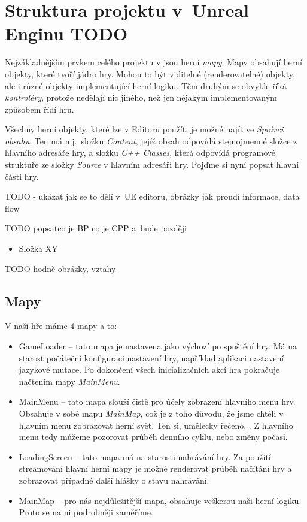 
\section{Struktura projektu v~Unreal Enginu TODO}
\label{sec:ueStructure}

Nejzákladnějším prvkem celého projektu v \UEu{} jsou herní \textit{mapy}. Mapy obsahují herní objekty, které tvoří jádro hry. Mohou to být viditelné (renderovatelné) objekty, ale i různé objekty implementující herní logiku. Těm druhým se obvykle říká \textit{kontroléry}, protože nedělají nic jiného, než jen nějakým implementovaným způsobem řídí hru.

Všechny herní objekty, které lze v Editoru použít, je možné najít ve \textit{Správci obsahu}. Ten má mj.~složku \textit{Content}, jejíž obsah odpovídá stejnojmenné složce z hlavního adresáře hry, a složku \textit{C++ Classes}, která odpovídá programové struktuře ze složky \textit{Source} v hlavním adresáři hry. Pojďme si nyní popsat hlavní části hry.

TODO
- ukázat jak se to dělí v~UE editoru, obrázky jak proudí informace, data flow


TODO  popsatco je BP co je CPP a~bude později 

\begin{itemize}
	\item Složka XY
\end{itemize}


TODO hodně obrázky, vztahy

\subsection{Mapy}

V naší hře máme 4 mapy a to:

\begin{itemize}
	\item GameLoader -- tato mapa je nastavena jako výchozí po spuštění hry. Má na starost počáteční konfiguraci nastavení hry, například aplikaci nastavení jazykové mutace. Po dokončení všech inicializačních akcí hra pokračuje načtením mapy \textit{MainMenu}.
	\item MainMenu -- tato mapa slouží čistě pro účely zobrazení hlavního menu hry. Obsahuje v sobě mapu \textit{MainMap}, což je z toho důvodu, že jsme chtěli v hlavním menu zobrazovat herní svět. Ten si, umělecky řečeno, . Z hlavního menu tedy můžeme pozorovat průběh denního cyklu, nebo změny počasí.
	\item LoadingScreen -- tato mapa má na starosti nahrávání hry. Za použití streamování hlavní herní mapy je možné renderovat průběh načítání hry a zobrazovat případné další hlášky o stavu nahrávání.
	\item MainMap -- pro nás nejdůležitější mapa, obsahuje veškerou naši herní logiku. Proto se na ni podrobněji zaměříme.
\end{itemize}

